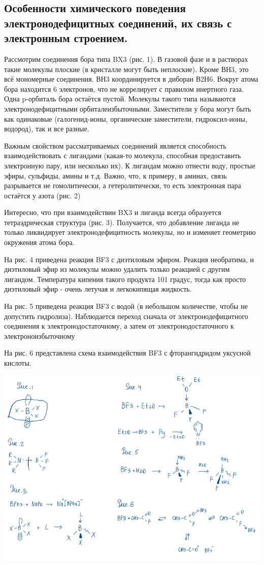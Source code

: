 \subsection{Особенности химического поведения электронодефицитных соединений, их связь с электронным строением.}

Рассмотрим соединения бора типа BX3 (рис. 1). В газовой фазе и в растворах такие молекулы плоские (в кристалле могут быть неплоские). Кроме ВН3, это всё мономерные
соединения. ВН3 координируется в диборан В2Н6. Вокруг атома бора находится 6 электронов, что не коррелирует с правилом инертного газа. Одна p-орбиталь бора остаётся пустой.
Молекулы такого типа называются электронодефицитными орбиталеизбыточными. Заместители у бора могут быть как одинаковые (галогенид-ионы, органические заместители,
гидроксил-ионы, водород), так и все разные.

Важным свойством рассматриваемых соединений является способность взаимодействовать с лигандами (какая-то молекула, способная предоставить электронную пару, или
несколько их). К лигандам можно отнести воду, простые эфиры, сульфиды, амины и т.д. Важно, что, к примеру, в аминах, связь разрывается не гомолитически, а гетеролитически, то
есть электронная пара остаётся у азота (рис. 2)

Интересно, что при взаимодействии BX3 и лиганда всегда образуется тетраэдрическая структура (рис. 3). Получается, что добавление лиганда не только ликвидирует
электронодефицитность молекулы, но и изменяет геометрию окружения атома бора. 

На рис. 4 приведена реакция BF3 с диэтиловым эфиром. Реакция необратима, и диэтиловый эфир из молекулы можно удалить только реакцией с другим лигандом. Температура
кипения такого продукта 101 градус, тогда как просто диэтиловый эфир - очень летучая и легкокипящая жидкость.

На рис. 5 приведена реакция BF3 с водой (в небольшом количестве, чтобы не допустить гидролиза). Наблюдается переход сначала от электронодефицитного соединения к
электронодостаточному, а затем от электронодостаточного к электроноизбыточному

На рис. 6 представлена схема взаимодействия BF3 с фторангидридом уксусной кислоты.

\includegraphics{images/16v1.png}

